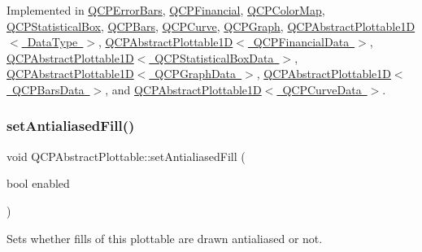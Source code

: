 Implemented in \mbox{\hyperlink{class_q_c_p_error_bars_ac1b6675ef43e32547a3cbcf7b7ac46ed}{Q\+C\+P\+Error\+Bars}}, \mbox{\hyperlink{class_q_c_p_financial_aac8e91622ac58330fa9ce81cc8fd40ee}{Q\+C\+P\+Financial}}, \mbox{\hyperlink{class_q_c_p_color_map_afb4b843596addf58096082827a9e3450}{Q\+C\+P\+Color\+Map}}, \mbox{\hyperlink{class_q_c_p_statistical_box_a1607fa92f829c631107c20ccb2d70a6d}{Q\+C\+P\+Statistical\+Box}}, \mbox{\hyperlink{class_q_c_p_bars_a121f899c27af3186fe93dcd0eb98f49b}{Q\+C\+P\+Bars}}, \mbox{\hyperlink{class_q_c_p_curve_a0ed9b7e6b4bc72010d6fcd974af46a8b}{Q\+C\+P\+Curve}}, \mbox{\hyperlink{class_q_c_p_graph_a6d669d04462d272c6aa0e5f85846d673}{Q\+C\+P\+Graph}}, \mbox{\hyperlink{class_q_c_p_abstract_plottable1_d_a071e2df66ba1746067dfcb5e27947b43}{Q\+C\+P\+Abstract\+Plottable1\+D$<$ Data\+Type $>$}}, \mbox{\hyperlink{class_q_c_p_abstract_plottable1_d_a071e2df66ba1746067dfcb5e27947b43}{Q\+C\+P\+Abstract\+Plottable1\+D$<$ Q\+C\+P\+Financial\+Data $>$}}, \mbox{\hyperlink{class_q_c_p_abstract_plottable1_d_a071e2df66ba1746067dfcb5e27947b43}{Q\+C\+P\+Abstract\+Plottable1\+D$<$ Q\+C\+P\+Statistical\+Box\+Data $>$}}, \mbox{\hyperlink{class_q_c_p_abstract_plottable1_d_a071e2df66ba1746067dfcb5e27947b43}{Q\+C\+P\+Abstract\+Plottable1\+D$<$ Q\+C\+P\+Graph\+Data $>$}}, \mbox{\hyperlink{class_q_c_p_abstract_plottable1_d_a071e2df66ba1746067dfcb5e27947b43}{Q\+C\+P\+Abstract\+Plottable1\+D$<$ Q\+C\+P\+Bars\+Data $>$}}, and \mbox{\hyperlink{class_q_c_p_abstract_plottable1_d_a071e2df66ba1746067dfcb5e27947b43}{Q\+C\+P\+Abstract\+Plottable1\+D$<$ Q\+C\+P\+Curve\+Data $>$}}.

\mbox{\label{class_q_c_p_abstract_plottable_a089d6b5577120239b55c39ed27c39536}} 
\subsubsection{\texorpdfstring{set\+Antialiased\+Fill()}{setAntialiasedFill()}}
{\footnotesize\ttfamily void Q\+C\+P\+Abstract\+Plottable\+::set\+Antialiased\+Fill (\begin{DoxyParamCaption}\item[{bool}]{enabled }\end{DoxyParamCaption})}

Sets whether fills of this plottable are drawn antialiased or not.

